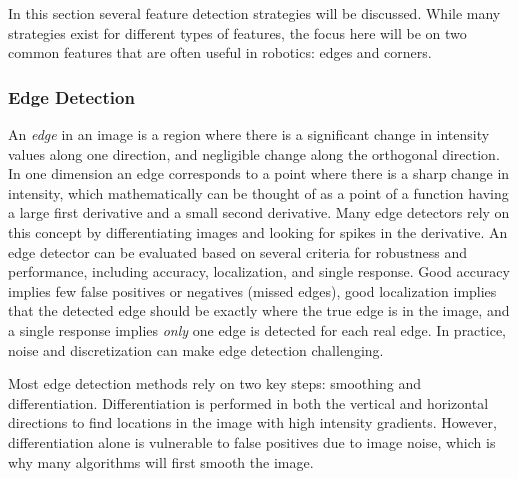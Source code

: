 In this section several feature detection strategies will be discussed. While many strategies exist for different types of features, the focus here will be on two common features that are often useful in robotics: edges and corners.


\subsubsection{Edge Detection}
An \textit{edge} in an image is a region where there is a significant change in intensity values along one direction, and negligible change along the orthogonal direction. In one dimension an edge corresponds to a point where there is a sharp change in intensity, which mathematically can be thought of as a point of a function having a large first derivative and a small second derivative. Many edge detectors rely on this concept by differentiating images and looking for spikes in the derivative.
An edge detector can be evaluated based on several criteria for robustness and performance, including accuracy, localization, and single response. Good accuracy implies few false positives or negatives (missed edges), good localization implies that the detected edge should be exactly where the true edge is in the image, and a single response implies \textit{only} one edge is detected for each real edge. In practice, noise and discretization can make edge detection challenging.

Most edge detection methods rely on two key steps: smoothing and differentiation. Differentiation is performed in both the vertical and horizontal directions to find locations in the image with high intensity gradients. However, differentiation alone is vulnerable to false positives due to image noise, which is why many algorithms will first smooth the image. 

